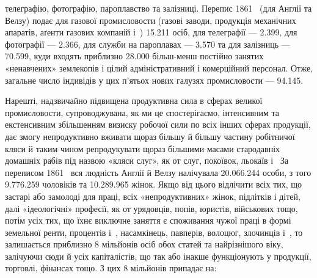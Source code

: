 \parcont{}  %
телеграфію, фотографію, пароплавство та залізниці. Перепис
1861~ (для Англії та Велзу) подає для газової промисловости
(газові заводи, продукція механічних апаратів, аґенти газових
компаній і~) \num{15.211} осіб, для телеграфії — \num{2.399}, для фотографії
— \num{2.366}, для служби на пароплавах — \num{3.570} та для залізниць —
\num{70.599}, куди входять приблизно \num{28.000} більш-менш постійно
занятих «ненавчених» землекопів і цілий адміністративний і комерційний
персонал. Отже, загальне число індивідів у цих п’ятьох
нових галузях промисловости — \num{94.145}.

Нарешті, надзвичайно підвищена продуктивна сила в сферах
великої промисловости, супроводжувана, як ми це спостерігаємо,
інтенсивним та екстенсивним збільшенням визиску робочої
сили по всіх інших сферах продукції, дає змогу непродуктивно
вживати щораз більшу й більшу частину робітничої кляси й таким
чином репродукувати щораз більшими масами стародавніх домашніх
рабів під назвою «кляси слуг», як от слуг, покоївок, льокаїв
і~ За переписом 1861~ вся людність Англії й Велзу налічувала
\num{20.066.244} особи, з того \num{9.776.259} чоловіків та \num{10.289.965} жінок.
Якщо від цього відлічити всіх тих, що застарі або замолоді
для праці, всіх «непродуктивних» жінок, підлітків і дітей,
далі «ідеологічні» професії, як от урядовців, попів, юристів,
військових тощо, потім усіх тих, що їхнє виключне заняття є
споживання чужої праці в формі земельної ренти, процентів і~, насамкінець, павперів, волоцюг, злочинців і~, то залишається
приблизно 8 мільйонів осіб обох статей та найрізнішого
віку, залічуючи сюди й усіх капіталістів, що так або інакше
функціонують у продукції, торговлі, фінансах тощо. З цих 8 мільйонів
припадає на:

